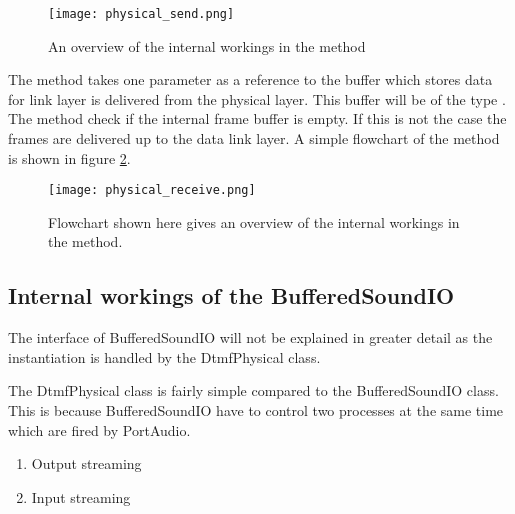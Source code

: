 	\begin{figure}[htb]
		\begin{center}
		\texttt{[image: physical\_send.png]}%
		\caption{An overview of the internal workings in the  method}
		\label{fig:physical_send}
		\end{center}
	\end{figure}
	
	The  method takes one parameter as a reference to the buffer which stores data for link layer is delivered from the physical layer.
	This buffer	will be of the type . The  method check if the internal frame buffer is empty.
	If this is not the case the frames are delivered up to the data link layer. A simple flowchart of the  method is shown in figure \ref{fig:physical_receive}.
	
	\begin{figure}[htb]
		\begin{center}
		\texttt{[image: physical\_receive.png]}%
		\caption{Flowchart shown here gives an overview of the internal workings in the  method.}
		\label{fig:physical_receive}
		\end{center}
	\end{figure}
	
	\subsection{Internal workings of the BufferedSoundIO}
	The interface of BufferedSoundIO will not be explained in greater detail as the instantiation is handled by the DtmfPhysical class.
	
	The DtmfPhysical class is fairly simple compared to the BufferedSoundIO class. This is because BufferedSoundIO have to control two processes
	at the same time which are fired by PortAudio.
	
	\begin{enumerate}
	\item Output streaming
	\item Input streaming
	\end{enumerate}
	
